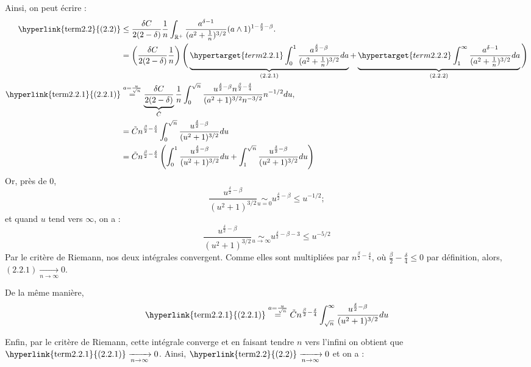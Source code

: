 \documentclass[openany]{book}
\makeatletter
\newcommand{\R}{\mathbb{R}}
\newcommand{\1}{\mathbbm{1}}
\renewenvironment{proof}[1][\textbf{\textit{Démonstration}}]{%
  \par\pushQED{\qed}%
  \normalfont\topsep6\p@\@plus6\p@\relax
  \trivlist\item[\hskip\labelsep
    #1\@addpunct{.}]\ignorespaces
}{%
  \popQED\endtrivlist\@endpefalse
}
\theoremstyle{thmfont}
\theoremstyle{deffont}
\theoremstyle{thmfont}
\theoremstyle{deffont}
\makeatother
\begin{document}
\begin{proof}
\begin{enumerate}
    Ainsi, on peut écrire :
    \begin{align*}
      \text{\hyperlink{term2.2}{(2.2)}} &\leq \dfrac{\delta C}{2(2-\delta)}\dfrac{1}{n} \int_{\R^+} \dfrac{a^{\delta-1}}{(a^2 + \frac{1}{n})^{3/2}}(a \wedge 1)^{1-\frac{\delta}{2} - \beta}.\\
              &= \left(\dfrac{\delta C}{2(2-\delta)}\dfrac{1}{n}\right)\Bigg( \underbrace{ \hypertarget{term2.2.1}\int_0^1 \dfrac{a^{\frac{\delta}{2} - \beta}}{(a^2 + \frac{1}{n})^{3/2}} da}_{(2.2.1)}
                + \underbrace{ \hypertarget{term2.2.2} \int_1^\infty \dfrac{a^{\delta - 1}}{(a^2 + \frac{1}{n})^{3/2}} da}_{(2.2.2)} \Bigg)\\  
      \text{\hyperlink{term2.2.1}{(2.2.1)}} &\overset{a = \frac{u}{\sqrt{n}}}{=} \underbrace{\dfrac{\delta C}{2(2-\delta)}}_{\tilde C}\dfrac{1}{n}  \int_0^{\sqrt{n}} \dfrac{u^{\frac{\delta}{2} - \beta} n^{ \frac{\beta}{2}-\frac{\delta}{4}}}{(a^2 + 1)^{3/2}n^{-3/2}} n^{-1/2}du,\\
              &= \tilde C n^{ \frac{\beta}{2}-\frac{\delta}{4}} \int_0^{\sqrt{n}} \dfrac{u^{\frac{\delta}{2} - \beta} }{(u^2 + 1)^{3/2}}du\\
              &= \tilde C n^{ \frac{\beta}{2}-\frac{\delta}{4}} \left( \int_0^1 \dfrac{u^{\frac{\delta}{2} - \beta}}{(u^2 + 1)^{3/2}}du + \int_1^{\sqrt{n}}\dfrac{u^{\frac{\delta}{2} - \beta}}{(u^2 + 1)^{3/2}}du\right)
    \end{align*}
    Or, près de $0$, 
    $$\dfrac{u^{\frac{\delta}{2} - \beta}}{(u^2 + 1)^{3/2}} \underset{u = 0}{\sim} u^{\frac{\delta}{2} - \beta} \leq u^{-1/2};$$
    et quand $u$ tend vers $\infty$, on a :
    $$\dfrac{u^{\frac{\delta}{2} - \beta}}{(u^2 + 1)^{3/2}} \underset{u \to \infty}{\sim} u^{\frac{\delta}{2} -\beta -3} \leq u^{-5/2}$$
    Par le critère de Riemann, nos deux intégrales convergent. Comme elles sont multipliées par $n^{ \frac{\beta}{2}-\frac{\delta}{4}}$, où $\frac{\beta}{2}-\frac{\delta}{4} \leq 0$ par définition, alors, $(2.2.1) \xrightarrow[n \to \infty]{} 0$.

    \noindent De la même manière,
    $$ \text{\hyperlink{term2.2.1}{(2.2.1)}} \overset{a = \frac{u}{\sqrt{n}}}{=} \tilde C n^{ \frac{\beta}{2}-\frac{\delta}{4}} \int_{\sqrt{n}}^\infty \dfrac{u^{\frac{\delta}{2} - \beta} }{(u^2 + 1)^{3/2}}du $$

    Enfin, par le critère de Riemann, cette intégrale converge et en faisant tendre $n$ vers l'infini on obtient que $\text{\hyperlink{term2.2.1}{(2.2.1)}} \xrightarrow[n \to \infty]{} 0$. Ainsi, $\text{\hyperlink{term2.2}{(2.2)}} \xrightarrow[n \to \infty]{} 0$ et on a :


\end{enumerate}
\end{proof}
\end{document}

